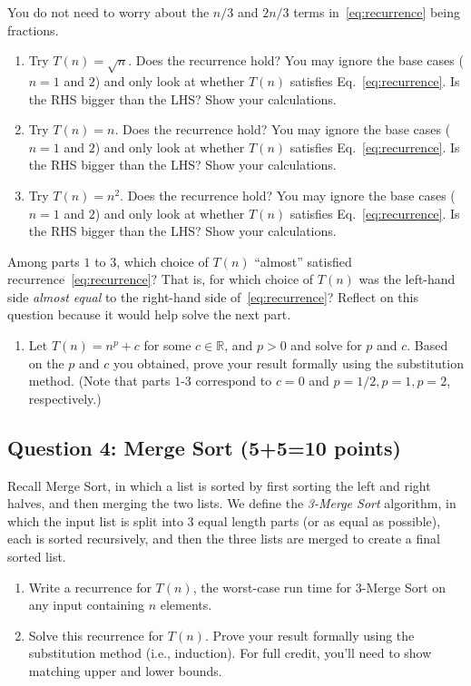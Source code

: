 You do not need to worry about the $n/3$ and $2n/3$ terms in~\eqref{eq:recurrence} being fractions. 

\begin{enumerate}
    \item Try $T(n) = \sqrt{n}$. Does the recurrence hold? You may ignore the base cases ($n=1$ and $2$) and only look at whether $T(n)$ satisfies Eq.~\eqref{eq:recurrence}. Is the RHS bigger than the LHS? Show your calculations.
    \item Try $T(n) = n$. Does the recurrence hold? You may ignore the base cases ($n=1$ and $2$) and only look at whether $T(n)$ satisfies Eq.~\eqref{eq:recurrence}. Is the RHS bigger than the LHS? Show your calculations.
    \item Try $T(n) = n^2$. Does the recurrence hold? You may ignore the base cases ($n=1$ and $2$) and only look at whether $T(n)$ satisfies Eq.~\eqref{eq:recurrence}. Is the RHS bigger than the LHS? Show your calculations.
\end{enumerate}
Among parts $1$ to $3$, which choice of $T(n)$ ``almost'' satisfied recurrence~\eqref{eq:recurrence}? That is, for which choice of $T(n)$ was the left-hand side \emph{almost equal} to the right-hand side of~\eqref{eq:recurrence}? Reflect on this question because it would help solve the next part. 
\begin{enumerate}[resume]
    \item Let $T(n) = n^p + c$ for some $c \in \mathbb{R}$, and $p > 0$ and solve for $p$ and $c$. Based on the $p$ and $c$ you obtained, prove your result formally using the substitution method. (Note that parts $1$-$3$ correspond to $c=0$ and $p=1/2,p=1,p=2$, respectively.)
\end{enumerate}



\subsection*{Question 4: Merge Sort (5+5=10 points)}

Recall Merge Sort, in which a list is sorted by first sorting the left and right halves, and then merging the two lists. 
We define the \textit{3-Merge Sort} algorithm, in which the input list is split into $3$
equal length parts (or as equal as possible), each is sorted recursively, and then the three lists are merged to create a final sorted list. 
\begin{enumerate}
    \item Write a recurrence for $T(n)$, the worst-case run time for 3-Merge Sort on any input containing $n$ elements.
    \item Solve this recurrence for $T(n)$. Prove your result formally using the substitution method (i.e., induction). For full credit, you'll need to show matching upper and lower bounds. 
\end{enumerate}



